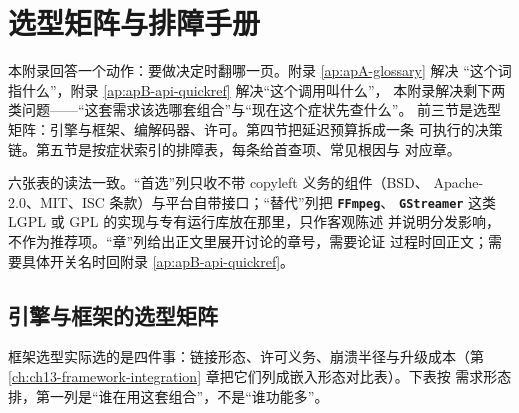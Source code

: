 \documentclass[12pt,a4paper,fontset=fandol]{ctexbook}
\newcommand{\Lib}[1]{\textbf{\texttt{#1}}}
\begin{document}
\chapter{选型矩阵与排障手册}
\label{ap:apC-selection}

本附录回答一个动作：要做决定时翻哪一页。附录 \ref{ap:apA-glossary} 解决
``这个词指什么''，附录 \ref{ap:apB-api-quickref} 解决``这个调用叫什么''，
本附录解决剩下两类问题——``这套需求该选哪套组合''与``现在这个症状先查什么''。
前三节是选型矩阵：引擎与框架、编解码器、许可。第四节把延迟预算拆成一条
可执行的决策链。第五节是按症状索引的排障表，每条给首查项、常见根因与
对应章。

六张表的读法一致。``首选''列只收不带 copyleft 义务的组件（BSD、
Apache-2.0、MIT、ISC 条款）与平台自带接口；``替代''列把 \Lib{FFmpeg}、
\Lib{GStreamer} 这类 LGPL 或 GPL 的实现与专有运行库放在那里，只作客观陈述
并说明分发影响，不作为推荐项。``章''列给出正文里展开讨论的章号，需要论证
过程时回正文；需要具体开关名时回附录 \ref{ap:apB-api-quickref}。

\section{引擎与框架的选型矩阵}

框架选型实际选的是四件事：链接形态、许可义务、崩溃半径与升级成本（第
\ref{ch:ch13-framework-integration} 章把它们列成嵌入形态对比表）。下表按
需求形态排，第一列是``谁在用这套组合''，不是``谁功能多''。
\end{document}
